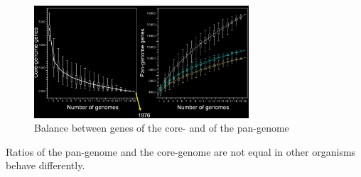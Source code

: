 \begin{figure}[h]
\caption{Balance between genes of the core- and of the pan-genome}\label{balancepancore}
\centering
\includegraphics[width=8cm]{corePanGenEcoli}
\end{figure}


Ratios of the pan-genome and the core-genome are not equal in other organisms behave differently.
